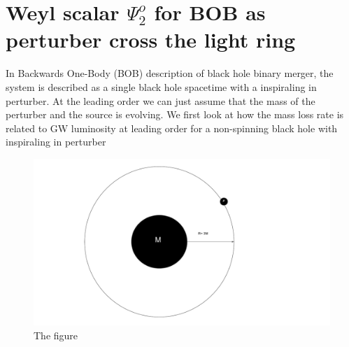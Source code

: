 \documentclass[prd,preprintnumbers,onecolumn,eqsecnum,floatfix,letter]{revtex4}
\begin{document}
\section{ Weyl scalar $\Psi^{o}_{2}$ for BOB as perturber cross the light ring }
In Backwards One-Body (BOB) \cite{McWilliams_2019} description of black hole binary merger, the system is described as a single black hole spacetime with a inspiraling in perturber. At the leading order we can just assume that the mass of the perturber and the source is evolving. We first look at how the mass loss rate is related to GW luminosity at leading order for a non-spinning black hole with inspiraling in perturber
\begin{figure}
	\includegraphics[width=5.5in]{../plots/BOB.pdf}
	\caption{The figure}
	\label{fig:BoBFig}
\end{figure} 
\end{document}
